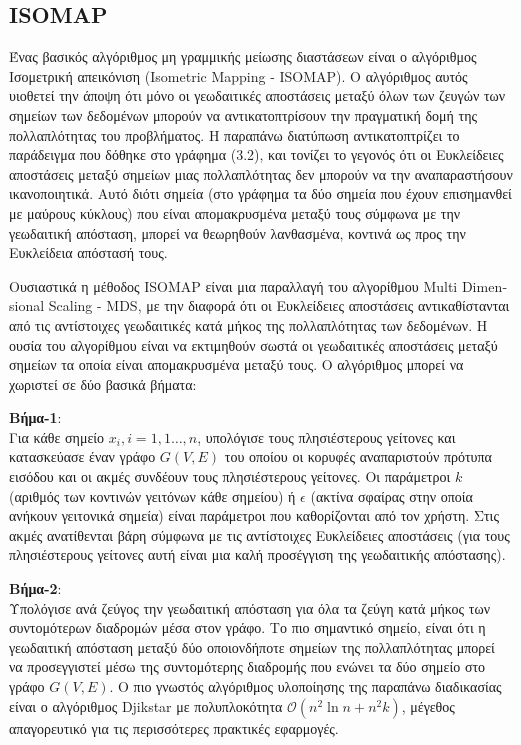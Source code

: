 \subsection{\textlatin{ISOMAP}}
\par
Ένας βασικός αλγόριθμος μη γραμμικής μείωσης διαστάσεων είναι ο αλγόριθμος Ισομετρική απεικόνιση \textlatin{(Isometric Mapping - ISOMAP)}\textlatin{\cite{isomap}}. Ο αλγόριθμος αυτός υιοθετεί την άποψη ότι μόνο οι γεωδαιτικές αποστάσεις μεταξύ όλων των ζευγών των σημείων των δεδομένων μπορούν να αντικατοπτρίσουν την πραγματική δομή της πολλαπλότητας του προβλήματος. Η παραπάνω διατύπωση αντικατοπτρίζει το παράδειγμα που δόθηκε στο γράφημα (3.2), και τονίζει το γεγονός ότι οι Ευκλείδειες αποστάσεις μεταξύ σημείων μιας πολλαπλότητας δεν μπορούν να την αναπαραστήσουν ικανοποιητικά. Αυτό διότι σημεία (στο γράφημα τα δύο σημεία που έχουν επισημανθεί με μαύρους κύκλους) που είναι απομακρυσμένα μεταξύ τους σύμφωνα με την γεωδαιτική απόσταση, μπορεί να θεωρηθούν λανθασμένα, κοντινά ως προς την Ευκλείδεια απόστασή τους.
\par
Ουσιαστικά η μέθοδος \textlatin{ISOMAP}\textlatin{\cite{isomap}} είναι μια παραλλαγή του αλγορίθμου \textlatin{Multi Dimensional Scaling - MDS}\textlatin{\cite{mds}}, με την διαφορά ότι οι Ευκλείδειες αποστάσεις αντικαθίστανται από τις αντίστοιχες γεωδαιτικές κατά μήκος της πολλαπλότητας των δεδομένων. Η ουσία του αλγορίθμου είναι να εκτιμηθούν σωστά οι γεωδαιτικές αποστάσεις μεταξύ σημείων τα οποία είναι απομακρυσμένα μεταξύ τους. Ο αλγόριθμος μπορεί να χωριστεί σε δύο βασικά βήματα:
\par
\textbf{Βήμα-1}: \\ Για κάθε σημείο $x_{i},i=1,1\ldots,n$, υπολόγισε τους πλησιέστερους γείτονες και κατασκεύασε έναν γράφο $G(V,E)$ του οποίου οι κορυφές αναπαριστούν πρότυπα εισόδου και οι ακμές συνδέουν τους πλησιέστερους γείτονες. Οι παράμετροι $k$ (αριθμός των κοντινών γειτόνων κάθε σημείου) ή $\epsilon$ (ακτίνα σφαίρας στην οποία ανήκουν γειτονικά σημεία) είναι παράμετροι που καθορίζονται από τον χρήστη. Στις ακμές ανατίθενται βάρη σύμφωνα με τις αντίστοιχες Ευκλείδειες αποστάσεις (για τους πλησιέστερους γείτονες αυτή είναι μια καλή προσέγγιση της γεωδαιτικής απόστασης).
\par
\textbf{Βήμα-2}: \\ Υπολόγισε ανά ζεύγος την γεωδαιτική απόσταση για όλα τα ζεύγη κατά μήκος των συντομότερων διαδρομών μέσα στον γράφο. Το πιο σημαντικό σημείο, είναι ότι η γεωδαιτική απόσταση μεταξύ δύο οποιονδήποτε σημείων της πολλαπλότητας μπορεί να προσεγγιστεί μέσω της συντομότερης διαδρομής που ενώνει τα δύο σημείο στο γράφο $G(V,E)$. Ο πιο γνωστός αλγόριθμος υλοποίησης της παραπάνω διαδικασίας είναι ο αλγόριθμος \textlatin{Djikstar} με πολυπλοκότητα $\mathcal{O}(n^{2}\ln n + n^{2}k)$, μέγεθος απαγορευτικό για τις περισσότερες πρακτικές εφαρμογές.
